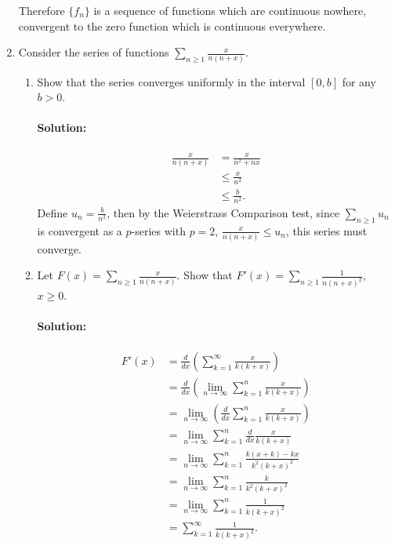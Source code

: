 \documentclass{article}
\begin{document}
\begin{enumerate}
  Therefore $\{f_n\} $ is a sequence of functions which are continuous nowhere, convergent to the zero function which is continuous everywhere. 

\item Consider the series of functions $\sum_{n\geq 1}^{} \frac{x}{n(n+x)}$.
  \begin{enumerate}
    \item Show that the series converges uniformly in the interval $[0,b]$ for any $b>0$.

        \paragraph{Solution:} 
        \begin{align*}
            \frac{x}{n(n+x)}&= \frac{x}{n^2+nx} \\
                            &\leq \frac{x}{n^2}\\
                            &\leq \frac{b}{n^2}
        .\end{align*}
        Define $u_n=\frac{b}{n^2}$, then by the Weierstrass Comparison test, since $\sum_{n\geq 1}^{} u_n$ is convergent as a $p$-series with $p=2$, $\frac{x}{n(n+x)}\leq u_n$, this series must converge.

    \item Let $F(x)=\sum_{n\geq 1}^{} \frac{x}{n(n+x)}$. Show that $F'(x)=\sum_{n\geq 1}^{} \frac{1}{n(n+x)^2}$, $x\geq 0$.
        \paragraph{Solution: }
        \begin{align*}
            F'(x)&= \frac{d}{dx}\left(  \sum_{k=1}^{\infty} \frac{x}{k(k+x)}\right)  \\
                &= \frac{d}{dx}\left( \lim_{n \to \infty} \sum_{k=1}^{n} \frac{x}{k(k+x)}\right)  \\
                &= \lim_{n \to \infty}\left( \frac{d}{dx}\sum_{k=1}^{n} \frac{x}{k(k+x)}  \right)\\
                &= \lim_{n \to \infty} \sum_{k=1}^{n} \frac{d}{dx}\frac{x}{k(k+x)}  \\
                &= \lim_{n \to \infty} \sum_{k=1}^{n} \frac{k(x+k)-kx}{k^2(k+x)^2}  \\
                &= \lim_{n \to \infty} \sum_{k=1}^{n} \frac{k}{k^2(k+x)^2}  \\
                &= \lim_{n \to \infty} \sum_{k=1}^{n} \frac{1}{k(k+x)^2}  \\
                &= \sum_{k=1}^{\infty} \frac{1}{k(k+x)^2} 
        .\end{align*}


\end{enumerate}
\end{enumerate}
\end{document}
